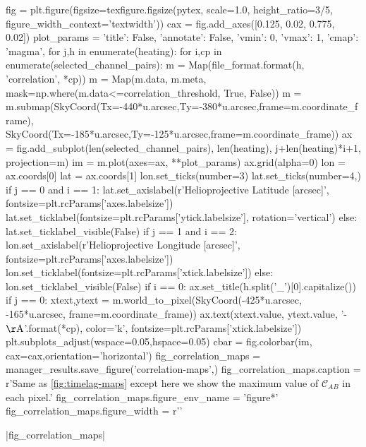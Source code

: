 \begin{pycode}
fig = plt.figure(figsize=texfigure.figsize(pytex, scale=1.0, height_ratio=3/5,
                                           figure_width_context='textwidth'))
cax = fig.add_axes([0.125, 0.02, 0.775, 0.02])
plot_params = {'title': False, 'annotate': False, 'vmin': 0, 'vmax': 1, 'cmap': 'magma',}
for j,h in enumerate(heating):
    for i,cp in enumerate(selected_channel_pairs):
        m = Map(file_format.format(h, 'correlation', *cp))
        m = Map(m.data, m.meta, mask=np.where(m.data<=correlation_threshold, True, False))
        m = m.submap(SkyCoord(Tx=-440*u.arcsec,Ty=-380*u.arcsec,frame=m.coordinate_frame),
                        SkyCoord(Tx=-185*u.arcsec,Ty=-125*u.arcsec,frame=m.coordinate_frame))
        ax = fig.add_subplot(len(selected_channel_pairs), len(heating), j+len(heating)*i+1,
                                projection=m)
        im = m.plot(axes=ax, **plot_params)
        ax.grid(alpha=0)
        lon = ax.coords[0]
        lat = ax.coords[1]
        lon.set_ticks(number=3)
        lat.set_ticks(number=4,) 
        if j == 0 and i == 1:
            lat.set_axislabel(r'Helioprojective Latitude [arcsec]', fontsize=plt.rcParams['axes.labelsize'])
            lat.set_ticklabel(fontsize=plt.rcParams['ytick.labelsize'], rotation='vertical')
        else:
            lat.set_ticklabel_visible(False)
        if j == 1 and i == 2:
            lon.set_axislabel(r'Helioprojective Longitude [arcsec]', fontsize=plt.rcParams['axes.labelsize'])
            lon.set_ticklabel(fontsize=plt.rcParams['xtick.labelsize'])
        else:
            lon.set_ticklabel_visible(False)
        if i == 0:
            ax.set_title(h.split('_')[0].capitalize())
        if j == 0:
            xtext,ytext = m.world_to_pixel(SkyCoord(-425*u.arcsec, -165*u.arcsec, frame=m.coordinate_frame))
            ax.text(xtext.value, ytext.value, '{}-{} $\mathrm{{\AA}}$'.format(*cp),
                    color='k', fontsize=plt.rcParams['xtick.labelsize'])
plt.subplots_adjust(wspace=0.05,hspace=0.05)
cbar = fig.colorbar(im, cax=cax,orientation='horizontal')
fig_correlation_maps = manager_results.save_figure('correlation-maps',)
fig_correlation_maps.caption = r'Same as \autoref{fig:timelag-maps} except here we show the maximum value of $\mathcal{C}_{AB}$ in each pixel.'
fig_correlation_maps.figure_env_name = 'figure*'
fig_correlation_maps.figure_width = r'\textwidth'
\end{pycode}
|fig_correlation_maps|


